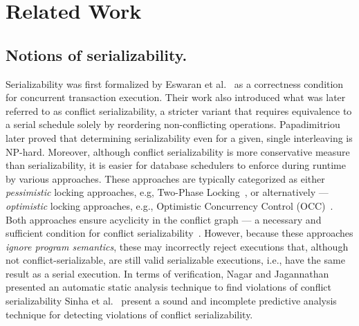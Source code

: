 \section{Related Work}
\label{sec:relatedWork}

%
%
%

\subsection{Notions of serializability.}
\label{sec:related:notions-of-serializability}


Serializability was first formalized by Eswaran et al.~\cite{EsGrKoTr76} as a correctness condition for concurrent transaction execution. Their work also introduced what was later referred to as conflict serializability, a stricter variant that requires equivalence to a serial schedule solely by reordering non-conflicting operations. Papadimitriou~\cite{Pa79, Pa86} later proved that determining serializability even for a given, single interleaving is NP-hard. 
%
Moreover, although conflict serializability is more conservative measure than serializability, it is easier for database schedulers to enforce during runtime by various approaches. 
%
These approaches are typically categorized as either \textit{pessimistic} locking approaches, e.g, Two-Phase Locking~\cite{BeHaGo87}, or alternatively --- \textit{optimistic} locking approaches, e.g., Optimistic Concurrency Control (OCC)~\cite{KuRo81, BuMo06}.
%
Both approaches ensure acyclicity in the conflict graph --- a necessary and sufficient condition for conflict serializability~\cite{SiMa10}. However, because these approaches \textit{ignore program semantics}, these may incorrectly reject executions that, although not conflict-serializable, are still valid serializable executions, i.e., have the same result as a serial execution. In terms of verification, Nagar and Jagannathan~\cite{KaJa18} presented an automatic static analysis technique to find violations of conflict serializability
%
Sinha et al.~\cite{SiMaWaGu11b} present a sound and incomplete predictive analysis technique for detecting violations of conflict serializability.


